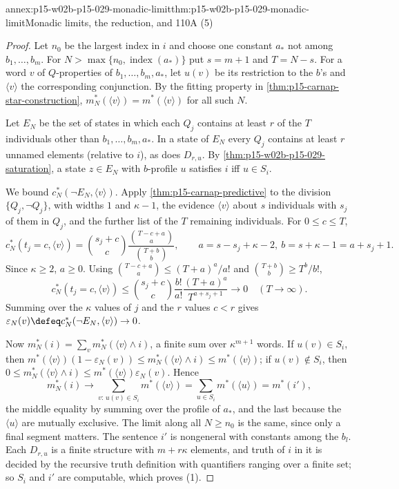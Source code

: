 \begin{annexitem}{annex:p15-w02b-p15-029-monadic-limit}{thm:p15-w02b-p15-029-monadic-limit}{Monadic limits, the reduction, and 110A (5)}
\begin{proof}
Let \(n_0\) be the largest index in \(i\) and choose one constant
\(a_*\) not among \(b_1,\ldots,b_m\). For \(N>\max\{n_0,\operatorname{index}(a_*)\}\)
put \(s=m+1\) and \(T=N-s\). For a word \(v\) of \(Q\)-properties
of \(b_1,\ldots,b_m,a_*\), let \(u(v)\) be its restriction to the
\(b\)'s and \(\langle v\rangle\) the corresponding conjunction. By
the fitting property in \cref{thm:p15-carnap-star-construction},
\(m^*_N(\langle v\rangle)=m^*(\langle v\rangle)\) for all such \(N\).

Let \(E_N\) be the set of states in which each \(Q_j\) contains at
least \(r\) of the \(T\) individuals other than
\(b_1,\ldots,b_m,a_*\). In a state of \(E_N\) every \(Q_j\) contains
at least \(r\) unnamed elements (relative to \(i\)), as does
\(D_{r,u}\). By \cref{thm:p15-w02b-p15-029-saturation}, a state
\(z\in E_N\) with \(b\)-profile \(u\) satisfies \(i\) iff
\(u\in S_i\).

We bound \(c^*_N(\neg E_N,\langle v\rangle)\). Apply
\cref{thm:p15-carnap-predictive} to the division
\(\{Q_j,\neg Q_j\}\), with widths \(1\) and \(\kappa-1\), the
evidence \(\langle v\rangle\) about \(s\) individuals with \(s_j\) of
them in \(Q_j\), and the further list of the \(T\) remaining
individuals. For \(0\leq c\leq T\),
\[
 c^*_N(t_j=c,\langle v\rangle)
 =\binom{s_j+c}{c}
  \frac{\binom{T-c+a}{a}}{\binom{T+b}{b}},\qquad
 a=s-s_j+\kappa-2,\ b=s+\kappa-1=a+s_j+1 .
\]
Since \(\kappa\geq2\), \(a\geq0\). Using
\(\binom{T-c+a}a\leq(T+a)^a/a!\) and
\(\binom{T+b}b\geq T^b/b!\),
\[
 c^*_N(t_j=c,\langle v\rangle)\leq
 \binom{s_j+c}{c}\frac{b!}{a!}\frac{(T+a)^a}{T^{a+s_j+1}}
 \longrightarrow0\quad(T\to\infty).
\]
Summing over the \(\kappa\) values of \(j\) and the \(r\) values
\(c<r\) gives \(\varepsilon_N(v)\defeq c^*_N(\neg E_N,\langle v\rangle)\to0\).

Now \(m^*_N(i)=\sum_vm^*_N(\langle v\rangle\land i)\), a finite sum
over \(\kappa^{m+1}\) words. If \(u(v)\in S_i\), then
\(m^*(\langle v\rangle)(1-\varepsilon_N(v))\leq
m^*_N(\langle v\rangle\land i)\leq m^*(\langle v\rangle)\); if
\(u(v)\notin S_i\), then
\(0\leq m^*_N(\langle v\rangle\land i)\leq
m^*(\langle v\rangle)\varepsilon_N(v)\). Hence
\[
 m^*_N(i)\longrightarrow\sum_{v:\,u(v)\in S_i}m^*(\langle v\rangle)
 =\sum_{u\in S_i}m^*(\langle u\rangle)=m^*(i'),
\]
the middle equality by summing over the profile of \(a_*\), and the
last because the \(\langle u\rangle\) are mutually exclusive. The
limit along all \(N\geq n_0\) is the same, since only a final segment
matters. The sentence \(i'\) is nongeneral with constants among the
\(b_l\). Each \(D_{r,u}\) is a finite structure with \(m+r\kappa\)
elements, and truth of \(i\) in it is decided by the recursive
truth definition with quantifiers ranging over a finite set; so
\(S_i\) and \(i'\) are computable, which proves (1).


\end{proof}
\end{annexitem}
